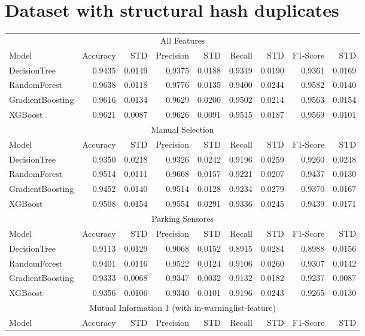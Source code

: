 \documentclass[11pt]{article}
\begin{document}
\section*{Dataset with structural hash duplicates}
\begin{tabular}{l|rr|rr|rr|rr}
	\multicolumn{9}{c}{All Features}\\
	Model & Accuracy & STD & Precision & STD & Recall & STD & F1-Score & STD \\
	\hline
	DecisionTree & 0.9435 & 0.0149 & 0.9375 & 0.0188 & 0.9349 & 0.0190 & 0.9361 & 0.0169 \\
	RandomForest  & 0.9638 & 0.0118 & 0.9776 & 0.0135 & 0.9400 & 0.0244 & 0.9582 & 0.0140 \\
	GradientBoosting  & 0.9616 & 0.0134 & 0.9629 & 0.0200 & 0.9502 & 0.0214 & 0.9563 & 0.0154 \\
	XGBoost & 0.9621 & 0.0087 & 0.9626 & 0.0091 & 0.9515 & 0.0187 & 0.9569 & 0.0101 \\
	\multicolumn{9}{c}{Manual Selection}\\
	Model & Accuracy & STD & Precision & STD & Recall & STD & F1-Score & STD \\
	\hline
	DecisionTree  & 0.9350 & 0.0218 & 0.9326 & 0.0242 & 0.9196 & 0.0259 & 0.9260 & 0.0248 \\
	RandomForest  & 0.9514 & 0.0111 & 0.9668 & 0.0157 & 0.9221 & 0.0207 & 0.9437 & 0.0130 \\
	GradientBoosting & 0.9452 & 0.0140 & 0.9514 & 0.0128 & 0.9234 & 0.0279 & 0.9370 & 0.0167 \\
	XGBoost  & 0.9508 & 0.0154 & 0.9554 & 0.0291 & 0.9336 & 0.0245 & 0.9439 & 0.0171 \\
	\multicolumn{9}{c}{Parking Sensores}\\
	Model & Accuracy & STD & Precision & STD & Recall & STD & F1-Score & STD \\
	\hline
	DecisionTree & 0.9113 & 0.0129 & 0.9068 & 0.0152 & 0.8915 & 0.0284 & 0.8988 & 0.0156 \\
	RandomForest & 0.9401 & 0.0116 & 0.9522 & 0.0124 & 0.9106 & 0.0260 & 0.9307 & 0.0142 \\
	GradientBoosting & 0.9333 & 0.0068 & 0.9347 & 0.0032 & 0.9132 & 0.0182 & 0.9237 & 0.0087 \\
	XGBoost & 0.9356 & 0.0106 & 0.9340 & 0.0101 & 0.9196 & 0.0243 & 0.9265 & 0.0130 \\
	\multicolumn{9}{c}{Mutual Information 1 (with in-warninglist-feature)}\\
	Model & Accuracy & STD & Precision & STD & Recall & STD & F1-Score & STD \\

\end{tabular}
\end{document}
